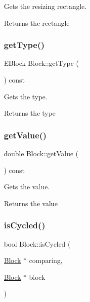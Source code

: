 Gets the resizing rectangle.

\begin{DoxyReturn}{Returns}
the rectangle 
\end{DoxyReturn}
\mbox{\label{classBlock_aefadce64bb60ab2e12a23bce510b74da}} 
\subsubsection{\texorpdfstring{get\+Type()}{getType()}}
{\footnotesize\ttfamily E\+Block Block\+::get\+Type (\begin{DoxyParamCaption}{ }\end{DoxyParamCaption}) const}

Gets the type.

\begin{DoxyReturn}{Returns}
the type 
\end{DoxyReturn}
\mbox{\label{classBlock_a613dd5c447f2a2dccebdaba7c2b4b74c}} 
\subsubsection{\texorpdfstring{get\+Value()}{getValue()}}
{\footnotesize\ttfamily double Block\+::get\+Value (\begin{DoxyParamCaption}{ }\end{DoxyParamCaption}) const}

Gets the value.

\begin{DoxyReturn}{Returns}
the value 
\end{DoxyReturn}
\mbox{\label{classBlock_aafbf3dd9d1af0a328878662cceb7de26}} 
\subsubsection{\texorpdfstring{is\+Cycled()}{isCycled()}}
{\footnotesize\ttfamily bool Block\+::is\+Cycled (\begin{DoxyParamCaption}\item[{\hyperlink{classBlock}{Block} $\ast$}]{comparing,  }\item[{\hyperlink{classBlock}{Block} $\ast$}]{block }\end{DoxyParamCaption})\hspace{0.3cm}{\ttfamily [static]}}

